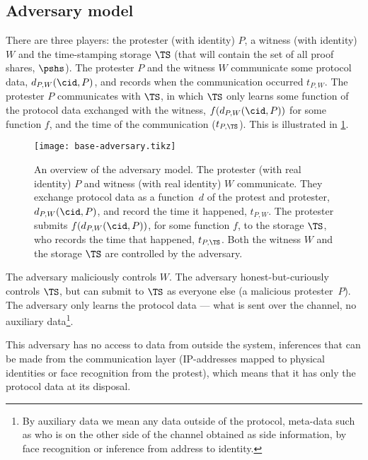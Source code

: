 \subsection{Adversary model}%
\label{formal-adversary-model}


There are three players: the protester (with identity) \(P\), a witness (with 
identity) \(W\) and the time-stamping storage \(\TS\) (that will contain the 
set of all proof shares, \(\pshs\)).
The protester \(P\) and the witness \(W\) communicate some protocol data,
\(d_{P,W}(\cid, P)\), and records when the communication occurred \(t_{P,W}\).
The protester \(P\) communicates with \(\TS\), in which \(\TS\) only learns 
some function of the protocol data exchanged with the witness, 
\(f(d_{P,W}(\cid, P))\) for some function \(f\), and the time of the 
communication (\(t_{P,\TS}\)).
This is illustrated in \cref{fig:base-adversary}.

\begin{figure}
  \centering
  \texttt{[image: base-adversary.tikz]}
  \caption{\label{fig:base-adversary}%
    An overview of the adversary model.
    The protester (with real identity) \(P\) and witness (with real identity) 
    \(W\) communicate.
    They exchange protocol data as a function~\(d\) of the protest and 
    protester, \(d_{P,W}(\cid, P)\), and record the time it happened, 
    \(t_{P,W}\).
    The protester submits \(f(d_{P,W}(\cid, P))\), for some function \(f\), to 
    the storage \(\TS\), who records the time that happened, \(t_{P,\TS}\).
    Both the witness \(W\) and the storage \(\TS\) are controlled by the 
    adversary.
  }
\end{figure}

The adversary maliciously controls \(W\).
The adversary honest-but-curiously controls \(\TS\), but can submit to \(\TS\) 
as everyone else (\ie a malicious protester~\(P\)).
The adversary only learns the protocol data --- \ie what is sent over the 
channel, no auxiliary data\footnote{%
  By auxiliary data we mean any data outside of the protocol, \ie
  meta-data such as who is on the other side of the channel obtained
  as side information, \eg by face recognition or inference from address
  to identity.
}.

This adversary has no access to data from outside the system, \eg inferences 
that can be made from the communication layer (\eg IP-addresses mapped to 
physical identities or face recognition from the protest), which means that it 
has only the protocol data at its disposal.

